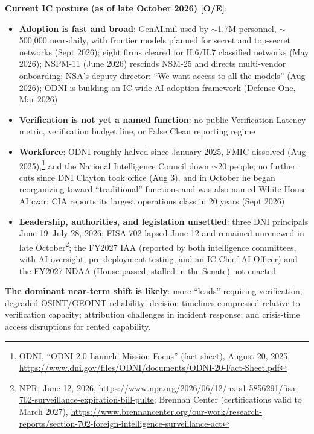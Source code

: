 \documentclass[11pt,letterpaper]{article}
\begin{document}
\textbf{Current IC posture (as of late October 2026) [O/E]}:
\begin{itemize}[nosep]
  \item \textbf{Adoption is fast and broad}: GenAI.mil used by $\sim$1.7M personnel, $\sim$500,000 near-daily, with frontier models planned for secret and top-secret networks (Sept 2026); eight firms cleared for IL6/IL7 classified networks (May 2026); NSPM-11 (June 2026) rescinds NSM-25 and directs multi-vendor onboarding; NSA's deputy director: ``We want access to all the models'' (Aug 2026); ODNI is building an IC-wide AI adoption framework (Defense One, Mar 2026)
  \item \textbf{Verification is not yet a named function}: no public Verification Latency metric, verification budget line, or False Clean reporting regime
  \item \textbf{Workforce}: ODNI roughly halved since January 2025, FMIC dissolved (Aug 2025),\footnote{ODNI, ``ODNI 2.0 Launch: Mission Focus'' (fact sheet), August 20, 2025. \url{https://www.dni.gov/files/ODNI/documents/ODNI-20-Fact-Sheet.pdf}} and the National Intelligence Council down $\sim$20 people; no further cuts since DNI Clayton took office (Aug 3), and in October he began reorganizing toward ``traditional'' functions and was also named White House AI czar; CIA reports its largest operations class in 20 years (Sept 2026)
  \item \textbf{Leadership, authorities, and legislation unsettled}: three DNI principals June 19--July 28, 2026; FISA 702 lapsed June 12 and remained unrenewed in late October\footnote{NPR, June 12, 2026, \url{https://www.npr.org/2026/06/12/nx-s1-5856291/fisa-702-surveillance-expiration-bill-pulte}; Brennan Center (certifications valid to March 2027), \url{https://www.brennancenter.org/our-work/research-reports/section-702-foreign-intelligence-surveillance-act}}; the FY2027 IAA (reported by both intelligence committees, with AI oversight, pre-deployment testing, and an IC Chief AI Officer) and the FY2027 NDAA (House-passed, stalled in the Senate) not enacted
\end{itemize}

\textbf{The dominant near-term shift is likely}: more ``leads'' requiring verification; degraded OSINT/GEOINT reliability; decision timelines compressed relative to verification capacity; attribution challenges in incident response; and crisis-time access disruptions for rented capability.
\end{document}
